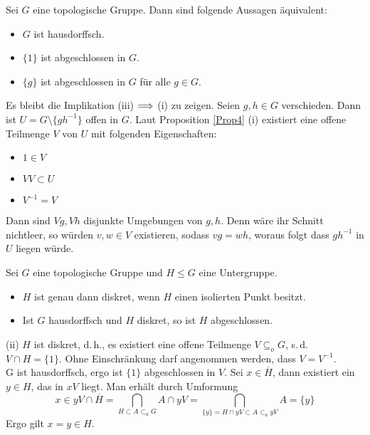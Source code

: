 \documentclass{book}
\renewcommand{\i}{^{-1}}
\begin{document}
\Prop{}
\label{Prop5}
Sei $G$ eine topologische Gruppe. Dann sind folgende Aussagen äquivalent:
\begin{itemize}
\item[(i)] $G$ ist hausdorffsch.
\item[(ii)] $\{1\}$ ist abgeschlossen in $G$.
\item[(iii)] $\{g\}$ ist abgeschlossen in $G$ für alle $g \in G$.
\end{itemize}
\begin{Beweis}{}
Es bleibt die Implikation (iii) $\overset{}{\Longrightarrow}$ (i) zu zeigen. Seien $g,h \in G$ verschieden. Dann ist $U = G \setminus \{gh\i\}$ offen in $G$. Laut Proposition \ref{Prop4} (i) existiert eine offene Teilmenge $V$ von $U$ mit folgenden Eigenschaften:
\begin{itemize}
\item $1\in V$
\item $VV \subset U$
\item $V\i = V$
\end{itemize}
Dann sind $Vg, Vh$ disjunkte Umgebungen von $g,h$. Denn wäre ihr Schnitt nichtleer, so würden $v,w\in V$ existieren, sodass $vg  = wh$, woraus folgt dass $gh\i $ in $ U$ liegen würde.
\end{Beweis}

\Prop{}
\label{Prop6}
Sei $G$ eine topologische Gruppe und $H \leq G$ eine Untergruppe.
\begin{itemize}
\item[(i)] $H$ ist genau dann diskret, wenn $H$ einen isolierten Punkt besitzt.
\item[(ii)] Ist $G$ hausdorffsch und $H$ diskret, so ist $H$ abgeschlossen.
\end{itemize}
\begin{Beweis}{(ii)}
$H$ ist diskret, d.\,h., es existiert eine offene Teilmenge $V \subseteq_o G$, s.\,d. $V \cap H = \{1\}$. Ohne Einschränkung darf angenommen werden, dass $V = V\i$.\\
G ist hausdorffsch, ergo ist $\{1\}$ abgeschlossen in $V$. Sei $x \in \overline{H}$, dann existiert ein $y \in H$, das in $xV$ liegt. Man erhält durch Umformung
\[ x \in yV \cap \overline{H} = \bigcap_{H \subset A \subset_a G} A \cap yV = \bigcap_{\{y\} = H \cap yV \subset A \subset_a yV} A  = \{y\} \]
Ergo gilt $x = y \in H$.
\end{Beweis}
\end{document}
